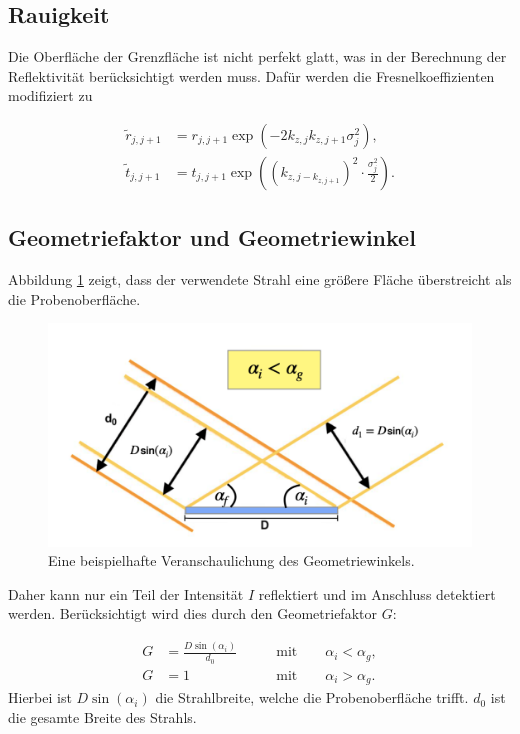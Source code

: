 \subsection{Rauigkeit}
Die Oberfläche der Grenzfläche ist nicht perfekt glatt, was in der Berechnung der Reflektivität berücksichtigt werden muss.
Dafür werden die Fresnelkoeffizienten modifiziert zu

\begin{align*}
    \tilde{r}_{j,j+1} &= r_{j,j+1} \exp{\left(-2k_{z,j}k_{z,j+1}\sigma_j^2\right)},\\
    \tilde{t}_{j,j+1} &= t_{j,j+1} \exp{\left(\left(k_{z,j-k_{z,j+1}}\right)^2\cdot\frac{\sigma_j^2}{2}\right)}.
\end{align*}

\subsection{Geometriefaktor und Geometriewinkel}

Abbildung \ref{fig:geo} zeigt, dass der verwendete Strahl eine größere Fläche überstreicht als die Probenoberfläche. 

\begin{figure}
  \centering
  \includegraphics[scale=0.5]{figures/anleit.png}
  \caption{Eine beispielhafte Veranschaulichung des Geometriewinkels. \cite{anleitung}}
  \label{fig:geo}
\end{figure} 
\noindent
Daher kann nur ein Teil der Intensität $I$ reflektiert und im Anschluss detektiert werden. Berücksichtigt wird dies
durch den Geometriefaktor $G$:

\begin{align}
    \label{eqn:geome}
    G &= \frac{D\sin{\left(\alpha_i\right)}}{d_0} \qquad &\text{mit} \qquad \alpha_i < \alpha_g,\\
    G &= 1 \qquad &\text{mit} \qquad \alpha_i > \alpha_g.
\end{align}
\noindent
Hierbei ist $D\sin{\left(\alpha_i\right)}$ die Strahlbreite, welche die Probenoberfläche trifft. $d_0$ ist die gesamte
Breite des Strahls.

